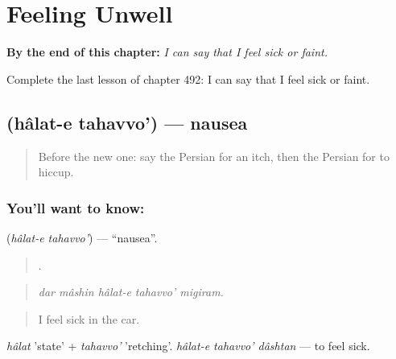 
\chapter{Feeling Unwell}
\label{ch:fa-feeling-unwell}

\begin{chapteropening}
\textbf{By the end of this chapter:} \emph{I can say that I feel sick or faint.}

Complete the last lesson of chapter 492: I can say that I feel sick or faint.
\end{chapteropening}

\section[\texorpdfstring{\fa{حالت} \fa{تهوع} (hâlat-e tahavvo')}{حالت تهوع (hâlat-e tahavvo')}]{  (hâlat-e tahavvo') — nausea}

\label{lesson:FA-C492-halat-e-tahavvo}



\begin{quote}
Before the new one: say the Persian for an itch, then the Persian for to hiccup.
\end{quote}

\subsection*{You'll want to know:  }
\textbf{ } (\emph{hâlat-e tahavvo'}) — \textquotedblleft{}nausea\textquotedblright{}.

\begin{quote}
    .
\end{quote}

\begin{quote}
\emph{dar mâshin hâlat-e tahavvo' migiram.}
\end{quote}

\begin{quote}
I feel sick in the car.
\end{quote}

\emph{hâlat} 'state' + \emph{tahavvo'} 'retching'. \emph{hâlat-e tahavvo' dâshtan} — to feel sick.

